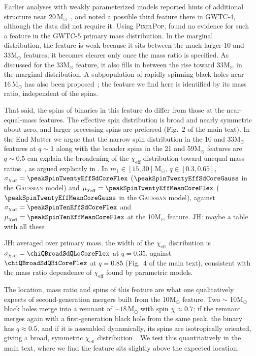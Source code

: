 \documentclass[%
 onecolumn,
 amsmath,amssymb,
 aps,
 prl,
 nofootinbib,nobibnotes,
]{revtex4-2}
\newcommand{\Msun}{\ensuremath{\mathrm{M}_{\odot}}}
\newcommand{\chieff}{\ensuremath{\chi_{\mathrm{eff}}}}
\newcommand{\jh}[1]{{\color{orange}JH: #1}}
\newcommand{\PixelPop}{\textsc{PixelPop}\xspace}
\newcommand{\gaussianspins}{\textsc{Gaussian}\xspace}
\newcommand{\featTen}{10\xspace}
\newcommand{\featTwenty}{21\xspace}
\newcommand{\featThirtyFive}{33\xspace}
\newcommand{\featSixty}{59\xspace}
\begin{document}
Earlier analyses with weakly parameterized models reported hints of additional structure near $20\,\Msun$~\cite{Tiwari:2020otp, Tiwari:2021yvr, Edelman:2022ydv, Toubiana:2023egi, MaganaHernandez:2024uty}, and \citet{LIGOScientific:2025pvj} noted a possible third feature there in \ac{GWTC-4}, although the data did not require it. Using \PixelPop, \citet{LIGOScientific:2026ctl} found no evidence for such a feature in the \ac{GWTC-5} primary mass distribution. In the marginal distribution, the feature is weak because it sits between the much larger \featTen and \featThirtyFive $\Msun$ features; it becomes clearer only once the mass ratio is specified. As discussed for the \featThirtyFive $\Msun$ feature, it also fills in between the rise toward \featThirtyFive $\Msun$ in the marginal distribution. A subpopulation of rapidly spinning black holes near $16\,\Msun$ has also been proposed~\cite{Plunkett:2026pxt, Tong:2025xir, Farah:2026jlc}; the feature we find here is identified by its mass ratio, independent of the spins.


That said, the spins of binaries in this feature do differ from those at the near-equal-mass features. The effective spin distribution is broad and nearly symmetric about zero, and larger precessing spins are preferred (Fig.~2 of the main text). In the End Matter we argue that the narrow spin distribution in the \featTen and \featThirtyFive $\Msun$ features at $q\sim1$ along with the broader spins in the \featTwenty and \featSixty $\Msun$ features are $q\sim 0.5$ can explain the broadening of the $\chieff$ distribution toward unequal mass ratios~\cite{Callister:2021fpo, Adamcewicz:2023mov, LIGOScientific:2026ctl}, as argued explicitly in \citet{Vijaykumar:2026zjy}. In $m_1 \in [15, 30]\,\Msun$, $q \in [0.3, 0.65]$, $\sigma_{\chieff} = \peakSpinTwentyEffSdCoreFlex$ ($\peakSpinTwentyEffSdCoreGauss$ in the \gaussianspins model) and $\mu_{\chieff} = \peakSpinTwentyEffMeanCoreFlex$ ($\peakSpinTwentyEffMeanCoreGauss$ in the \gaussianspins model), against $\sigma_{\chieff} = \peakSpinTenEffSdCoreFlex$ and $\mu_{\chieff} = \peakSpinTenEffMeanCoreFlex$ at the \featTen $\Msun$ feature. \jh{maybe a table with all these}

\jh{averaged over primary mass, the width of the $\chieff$ distribution is $\sigma_{\chieff} = \chiQBroadSdQLoCoreFlex$ at $q = 0.35$, against $\chiQBroadSdQHiCoreFlex$ at $q = 0.85$ (Fig.~4 of the main text), consistent with the mass ratio dependence of $\chieff$ found by parametric models. }

The location, mass ratio and spins of this feature are what one qualitatively expects of second-generation mergers built from the \featTen $\Msun$ feature. Two $\sim$ \featTen $\Msun$ black holes merge into a remnant of $\sim 18\,\Msun$ with spin $\chi \approx 0.7$; if the remnant merges again with a first-generation black hole from the same peak, the binary has $q \approx 0.5$, and if it is assembled dynamically, its spins are isotropically oriented, giving a broad, symmetric $\chieff$ distribution~\cite{Fishbach:2017dwv, Gerosa:2017kvu, Rodriguez:2019huv, Gerosa:2021mno, Ginat:2026awh}. We test this quantitatively in the main text, where we find the feature sits slightly above the expected location. 
\end{document}
